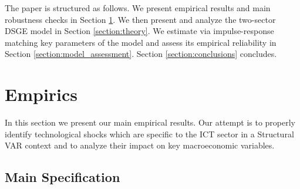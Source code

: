 \documentclass[12pt]{article}
\begin{document}

The paper is structured as follows. We present empirical results and main robustness checks in Section \ref{section:empirics}. We then present and analyze the two-sector DSGE model in Section \ref{section:theory}. We estimate via impulse-response matching key parameters of the model and assess its empirical reliability in Section \ref{section:model_assessment}. Section \ref{section:conclusions} concludes.



\section{Empirics}\label{section:empirics}

In this section we present our main empirical results. Our attempt is to properly identify technological shocks which are specific to the ICT sector in a Structural VAR context and to analyze their impact on key macroeconomic variables.

\subsection{Main Specification}\label{section:mainSpec}
\end{document}
